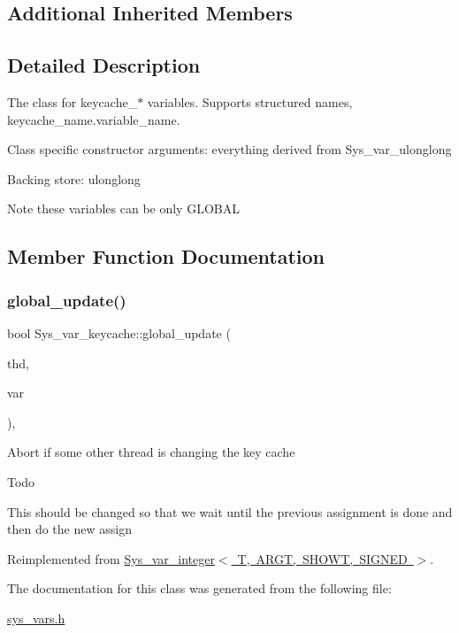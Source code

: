 \subsection*{Additional Inherited Members}


\subsection{Detailed Description}
The class for keycache\+\_\+$\ast$ variables. Supports structured names, keycache\+\_\+name.\+variable\+\_\+name.

Class specific constructor arguments\+: everything derived from Sys\+\_\+var\+\_\+ulonglong

Backing store\+: ulonglong

\begin{DoxyNote}{Note}
these variables can be only G\+L\+O\+B\+AL 
\end{DoxyNote}


\subsection{Member Function Documentation}
\mbox{\label{classSys__var__keycache_a7775f6e9ee55bb58461d6556f053075f}} 
\subsubsection{\texorpdfstring{global\+\_\+update()}{global\_update()}}
{\footnotesize\ttfamily bool Sys\+\_\+var\+\_\+keycache\+::global\+\_\+update (\begin{DoxyParamCaption}\item[{T\+HD $\ast$}]{thd,  }\item[{\mbox{\hyperlink{classset__var}{set\+\_\+var}} $\ast$}]{var }\end{DoxyParamCaption})\hspace{0.3cm}{\ttfamily [inline]}, {\ttfamily [virtual]}}

Abort if some other thread is changing the key cache \begin{DoxyRefDesc}{Todo}
\item[\mbox{\hyperlink{todo__todo000127}{Todo}}]This should be changed so that we wait until the previous assignment is done and then do the new assign \end{DoxyRefDesc}


Reimplemented from \mbox{\hyperlink{classSys__var__integer}{Sys\+\_\+var\+\_\+integer$<$ T, A\+R\+G\+T, S\+H\+O\+W\+T, S\+I\+G\+N\+E\+D $>$}}.



The documentation for this class was generated from the following file\+:\begin{DoxyCompactItemize}
\item 
\mbox{\hyperlink{sys__vars_8h}{sys\+\_\+vars.\+h}}\end{DoxyCompactItemize}
